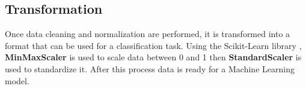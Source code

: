         \subsection{Transformation}

        Once data cleaning and normalization are performed, it is transformed into a format that can be used for a classification task. Using the Scikit-Learn library \cite{sklearn_api}, \textbf{MinMaxScaler} is used to scale data between 0 and 1 then \textbf{StandardScaler} is used to standardize it. After this process data is ready for a Machine Learning model.

\cleardoublepage
